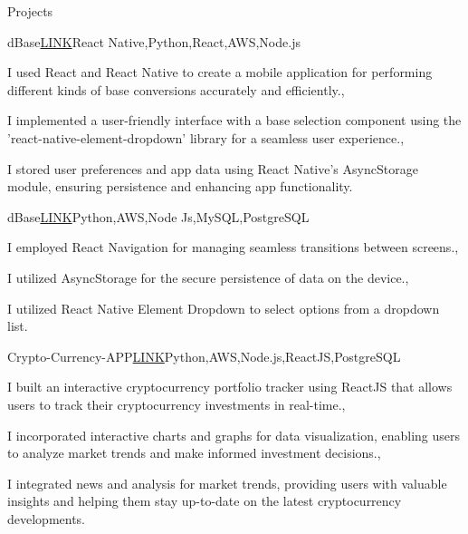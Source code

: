 \documentclass[
	11pt, %
]{resume} %
\begin{document}
\begin{rSection}{Projects}

	\begin{rSubsection}{dBase}{\href{}{LINK}}{React Native,Python,React,AWS,Node.js}{}
		\item I used React and React Native to create a mobile application for performing different kinds of base conversions accurately and efficiently.,\item I implemented a user-friendly interface with a base selection component using the 'react-native-element-dropdown' library for a seamless user experience.,\item I stored user preferences and app data using React Native's AsyncStorage module, ensuring persistence and enhancing app functionality.
	\end{rSubsection}


	\begin{rSubsection}{dBase}{\href{}{LINK}}{Python,AWS,Node Js,MySQL,PostgreSQL}{}
		 \item I employed React Navigation for managing seamless transitions between screens.,\item I utilized AsyncStorage for the secure persistence of data on the device.,\item I utilized React Native Element Dropdown to select options from a dropdown list. 
	\end{rSubsection}


\begin{rSubsection}{Crypto-Currency-APP}{\href{}{LINK}}{Python,AWS,Node.js,ReactJS,PostgreSQL}{}
	\item I built an interactive cryptocurrency portfolio tracker using ReactJS that allows users to track their cryptocurrency investments in real-time.,\item I incorporated interactive charts and graphs for data visualization, enabling users to analyze market trends and make informed investment decisions.,\item I integrated news and analysis for market trends, providing users with valuable insights and helping them stay up-to-date on the latest cryptocurrency developments.
\end{rSubsection}

\end{rSection}
\end{document}

